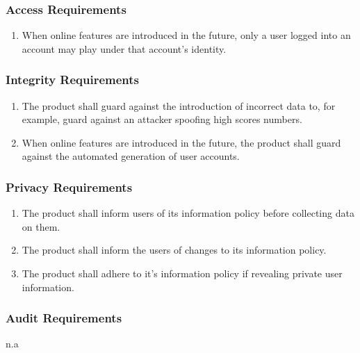 \documentclass[]{article}
\begin{document}
\subsubsection{Access Requirements}
\label{ssub:access_requirements}
\begin{enumerate}[{SR}1. ]
	\item When online features are introduced in the future, only a user logged into an account may play under that account's identity.
	\holdEnum
\end{enumerate}

\subsubsection{Integrity Requirements}
\label{ssub:integrity_requirements}
\begin{enumerate}[{SR}1. ]
	\resumeEnum
	\item The product shall guard against the introduction of incorrect data to, for example, guard against an attacker spoofing high scores numbers.
	\item When online features are introduced in the future, the product shall guard against the automated generation of user accounts. 
	\holdEnum
\end{enumerate}

\subsubsection{Privacy Requirements}
\label{ssub:privacy_requirements}
\begin{enumerate}[{SR}1. ]
	\resumeEnum
	\item The product shall inform users of its information policy before collecting data on them.
	\item The product shall inform the users of changes to its information policy.
	\item The product shall adhere to it's information policy if revealing private user information.
	\holdEnum
\end{enumerate}

\subsubsection{Audit Requirements}
\label{ssub:audit_requirements}
n.a
\end{document}
